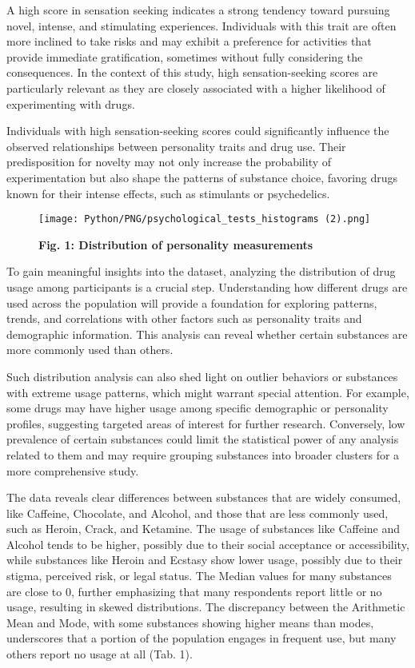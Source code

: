 \documentclass{article}
\begin{document}
\hspace{1cm}
A high score in sensation seeking indicates a strong tendency toward pursuing novel, intense, and stimulating experiences. Individuals with this trait are often more inclined to take risks and may exhibit a preference for activities that provide immediate gratification, sometimes without fully considering the consequences. In the context of this study, high sensation-seeking scores are particularly relevant as they are closely associated with a higher likelihood of experimenting with drugs.
\newpage

Individuals with high sensation-seeking scores could significantly influence the observed relationships between personality traits and drug use. Their predisposition for novelty may not only increase the probability of experimentation but also shape the patterns of substance choice, favoring drugs known for their intense effects, such as stimulants or psychedelics. 



\begin{figure}[!h]
    \centering
    \texttt{[image: Python/PNG/psychological\_tests\_histograms (2).png]}
    \caption{\textbf{Fig. 1: Distribution of personality measurements
}}
\end{figure}


\hspace{1cm} To gain meaningful insights into the dataset, analyzing the distribution of drug usage among participants is a crucial step. Understanding how different drugs are used across the population will provide a foundation for exploring patterns, trends, and correlations with other factors such as personality traits and demographic information. This analysis can reveal whether certain substances are more commonly used than others.

Such distribution analysis can also shed light on outlier behaviors or substances with extreme usage patterns, which might warrant special attention. For example, some drugs may have higher usage among specific demographic or personality profiles, suggesting targeted areas of interest for further research. Conversely, low prevalence of certain substances could limit the statistical power of any analysis related to them and may require grouping substances into broader clusters for a more comprehensive study.

\hspace{1cm}The data reveals clear differences between substances that are widely consumed, like Caffeine, Chocolate, and Alcohol, and those that are less commonly used, such as Heroin, Crack, and Ketamine. The usage of substances like Caffeine and Alcohol tends to be higher, possibly due to their social acceptance or accessibility, while substances like Heroin and Ecstasy show lower usage, possibly due to their stigma, perceived risk, or legal status. The Median values for many substances are close to 0, further emphasizing that many respondents report little or no usage, resulting in skewed distributions. The discrepancy between the Arithmetic Mean and Mode, with some substances showing higher means than modes, underscores that a portion of the population engages in frequent use, but many others report no usage at all (Tab. 1).
\end{document}
